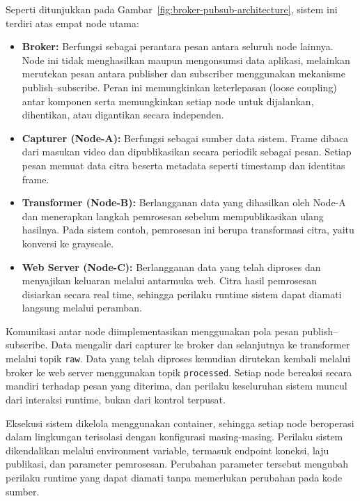Seperti ditunjukkan pada Gambar~\ref{fig:broker-pubsub-architecture}, sistem ini
terdiri atas empat node utama:

\begin{itemize}
  \item \textbf{Broker:} Berfungsi sebagai perantara pesan antara seluruh node
        lainnya. Node ini tidak menghasilkan maupun mengonsumsi data aplikasi,
        melainkan merutekan pesan antara publisher dan subscriber menggunakan
        mekanisme publish–subscribe. Peran ini memungkinkan keterlepasan
        (loose coupling) antar komponen serta memungkinkan setiap node untuk
        dijalankan, dihentikan, atau digantikan secara independen.
  \item \textbf{Capturer (Node-A):} Berfungsi sebagai sumber data sistem. Frame
        dibaca dari masukan video dan dipublikasikan secara periodik sebagai pesan.
        Setiap pesan memuat data citra beserta metadata seperti timestamp dan
        identitas frame.
  \item \textbf{Transformer (Node-B):} Berlangganan data yang dihasilkan oleh
        Node-A dan menerapkan langkah pemrosesan sebelum mempublikasikan ulang
        hasilnya. Pada sistem contoh, pemrosesan ini berupa transformasi citra,
        yaitu konversi ke grayscale.
  \item \textbf{Web Server (Node-C):} Berlangganan data yang telah diproses dan
        menyajikan keluaran melalui antarmuka web. Citra hasil pemrosesan
        disiarkan secara real time, sehingga perilaku runtime sistem dapat diamati
        langsung melalui peramban.
\end{itemize}

Komunikasi antar node diimplementasikan menggunakan pola pesan publish–subscribe.
Data mengalir dari capturer ke broker dan selanjutnya ke transformer melalui topik
\texttt{raw}. Data yang telah diproses kemudian dirutekan kembali melalui broker
ke web server menggunakan topik \texttt{processed}. Setiap node bereaksi secara
mandiri terhadap pesan yang diterima, dan perilaku keseluruhan sistem muncul dari
interaksi runtime, bukan dari kontrol terpusat.

Eksekusi sistem dikelola menggunakan container, sehingga setiap node beroperasi
dalam lingkungan terisolasi dengan konfigurasi masing-masing. Perilaku sistem
dikendalikan melalui environment variable, termasuk endpoint koneksi, laju
publikasi, dan parameter pemrosesan. Perubahan parameter tersebut mengubah
perilaku runtime yang dapat diamati tanpa memerlukan perubahan pada kode sumber.

